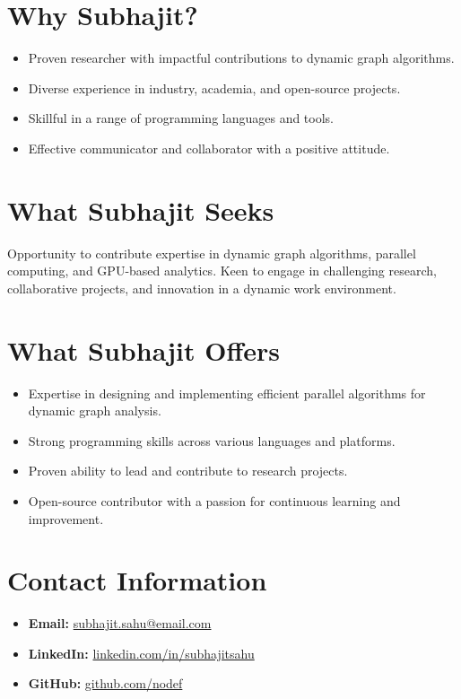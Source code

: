 \documentclass[a4paper,10pt]{article}
\begin{document}
\section*{Why Subhajit?}
\begin{itemize}[noitemsep, leftmargin=*]
  \item Proven researcher with impactful contributions to dynamic graph algorithms.
  \item Diverse experience in industry, academia, and open-source projects.
  \item Skillful in a range of programming languages and tools.
  \item Effective communicator and collaborator with a positive attitude.
\end{itemize}

\section*{What Subhajit Seeks}
Opportunity to contribute expertise in dynamic graph algorithms, parallel computing, and GPU-based analytics. Keen to engage in challenging research, collaborative projects, and innovation in a dynamic work environment.

\section*{What Subhajit Offers}
\begin{itemize}[noitemsep, leftmargin=*]
  \item Expertise in designing and implementing efficient parallel algorithms for dynamic graph analysis.
  \item Strong programming skills across various languages and platforms.
  \item Proven ability to lead and contribute to research projects.
  \item Open-source contributor with a passion for continuous learning and improvement.
\end{itemize}

\section*{Contact Information}
\begin{itemize}[noitemsep, leftmargin=*]
  \item \textbf{Email:} \href{mailto:subhajit.sahu@email.com}{subhajit.sahu@email.com}
  \item \textbf{LinkedIn:} \href{https://www.linkedin.com/in/subhajitsahu}{linkedin.com/in/subhajitsahu}
  \item \textbf{GitHub:} \href{https://github.com/nodef}{github.com/nodef}
\end{itemize}
\end{document}
